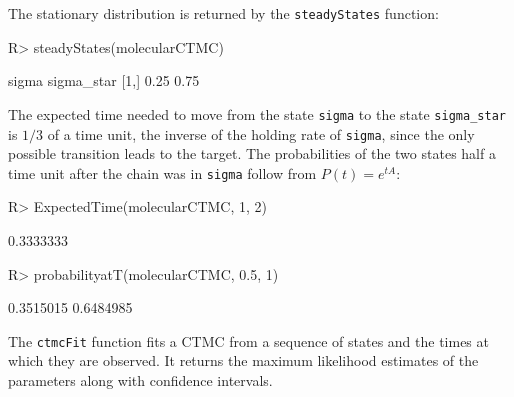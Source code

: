\documentclass[
  nojss]{jss}
\begin{document}
The stationary distribution is returned by the \texttt{steadyStates} function:

\begin{CodeChunk}
\begin{CodeInput}
R> steadyStates(molecularCTMC)
\end{CodeInput}
\begin{CodeOutput}
     sigma sigma_star
[1,]  0.25       0.75
\end{CodeOutput}
\end{CodeChunk}

The expected time needed to move from the state \texttt{sigma} to the state \texttt{sigma\_star} is \(1/3\) of a time unit, the inverse of the holding rate of \texttt{sigma}, since the only possible transition leads to the target. The probabilities of the two states half a time unit after the chain was in \texttt{sigma} follow from \(P(t) = e^{tA}\):

\begin{CodeChunk}
\begin{CodeInput}
R> ExpectedTime(molecularCTMC, 1, 2)
\end{CodeInput}
\begin{CodeOutput}
[1] 0.3333333
\end{CodeOutput}
\begin{CodeInput}
R> probabilityatT(molecularCTMC, 0.5, 1)
\end{CodeInput}
\begin{CodeOutput}
[1] 0.3515015 0.6484985
\end{CodeOutput}
\end{CodeChunk}

The \texttt{ctmcFit} function fits a CTMC from a sequence of states and the times at which they are observed. It returns the maximum likelihood estimates of the parameters along with confidence intervals.
\end{document}
